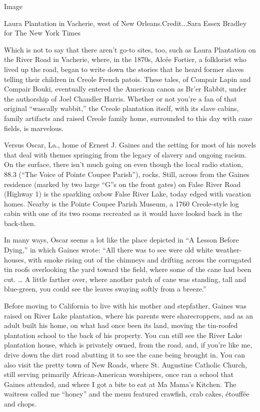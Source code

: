 Image

Laura Plantation in Vacherie, west of New Orleans.Credit...Sara Essex
Bradley for The New York Times

Which is not to say that there aren't go-to sites, too, such as Laura
Plantation on the River Road in Vacherie, where, in the 1870s, Alcée
Fortier, a folklorist who lived up the road, began to write down the
stories that he heard former slaves telling their children in Creole
French patois. These tales, of Compair Lapin and Compair Bouki,
eventually entered the American canon as Br'er Rabbit, under the
authorship of Joel Chandler Harris. Whether or not you're a fan of that
original ``wascally wabbit,'' the Creole plantation itself, with its
slave cabins, family artifacts and raised Creole family home, surrounded
to this day with cane fields, is marvelous.

Versus Oscar, La., home of Ernest J. Gaines and the setting for most of
his novels that deal with themes springing from the legacy of slavery
and ongoing racism. On the surface, there isn't much going on even
though the local radio station, 88.3 (``The Voice of Pointe Coupee
Parish''), rocks. Still, across from the Gaines residence (marked by two
large ``G''s on the front gates) on False River Road (Highway 1) is the
sparkling oxbow False River Lake, today edged with vacation homes.
Nearby is the Pointe Coupee Parish Museum, a 1760 Creole-style log cabin
with one of its two rooms recreated as it would have looked back in the
back-then.

In many ways, Oscar seems a lot like the place depicted in ``A Lesson
Before Dying,'' in which Gaines wrote: ``All there was to see were old
white weather-houses, with smoke rising out of the chimneys and drifting
across the corrugated tin roofs overlooking the yard toward the field,
where some of the cane had been cut. \ldots{} A little farther over,
where another patch of cane was standing, tall and blue-green, you could
see the leaves swaying softly from a breeze.''

Before moving to California to live with his mother and stepfather,
Gaines was raised on River Lake plantation, where his parents were
sharecroppers, and as an adult built his home, on what had once been its
land, moving the tin-roofed plantation school to the back of his
property. You can still see the River Lake plantation house, which is
privately owned, from the road, and, if you're like me, drive down the
dirt road abutting it to see the cane being brought in. You can also
visit the pretty town of New Roads, where St. Augustine Catholic Church,
still serving primarily African-American worshipers, once ran a school
that Gaines attended, and where I got a bite to eat at Ma Mama's
Kitchen. The waitress called me ``honey'' and the menu featured
crawfish, crab cakes, étouffée and chops.

